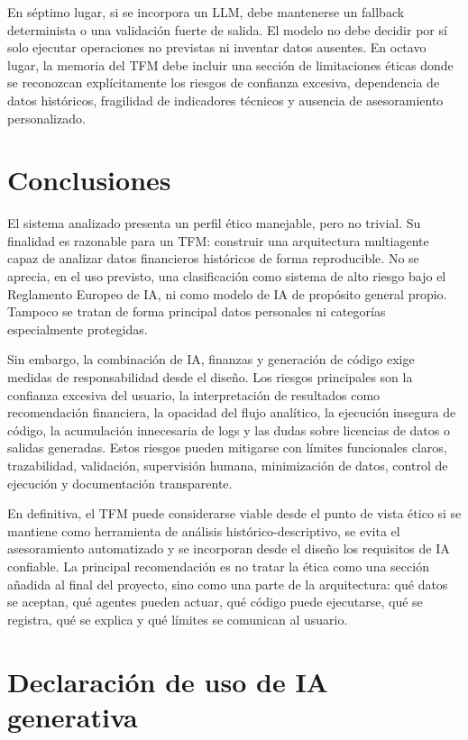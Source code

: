\documentclass{article}
\begin{document}
En séptimo lugar, si se incorpora un LLM, debe mantenerse un fallback determinista o una validación fuerte de salida. El modelo no debe decidir por sí solo ejecutar operaciones no previstas ni inventar datos ausentes. En octavo lugar, la memoria del TFM debe incluir una sección de limitaciones éticas donde se reconozcan explícitamente los riesgos de confianza excesiva, dependencia de datos históricos, fragilidad de indicadores técnicos y ausencia de asesoramiento personalizado.

\section{Conclusiones}

El sistema analizado presenta un perfil ético manejable, pero no trivial. Su finalidad es razonable para un TFM: construir una arquitectura multiagente capaz de analizar datos financieros históricos de forma reproducible. No se aprecia, en el uso previsto, una clasificación como sistema de alto riesgo bajo el Reglamento Europeo de IA, ni como modelo de IA de propósito general propio. Tampoco se tratan de forma principal datos personales ni categorías especialmente protegidas.

Sin embargo, la combinación de IA, finanzas y generación de código exige medidas de responsabilidad desde el diseño. Los riesgos principales son la confianza excesiva del usuario, la interpretación de resultados como recomendación financiera, la opacidad del flujo analítico, la ejecución insegura de código, la acumulación innecesaria de logs y las dudas sobre licencias de datos o salidas generadas. Estos riesgos pueden mitigarse con límites funcionales claros, trazabilidad, validación, supervisión humana, minimización de datos, control de ejecución y documentación transparente.

En definitiva, el TFM puede considerarse viable desde el punto de vista ético si se mantiene como herramienta de análisis histórico-descriptivo, se evita el asesoramiento automatizado y se incorporan desde el diseño los requisitos de IA confiable. La principal recomendación es no tratar la ética como una sección añadida al final del proyecto, sino como una parte de la arquitectura: qué datos se aceptan, qué agentes pueden actuar, qué código puede ejecutarse, qué se registra, qué se explica y qué límites se comunican al usuario.

\section*{Declaración de uso de IA generativa}
\end{document}
